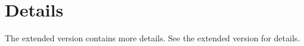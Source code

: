 \section{Details}
\ifextended
The extended version contains more details. %
\else
See the extended version for details. %
\fi
